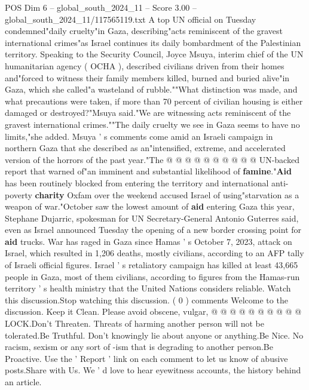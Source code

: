 \begin{textsample}{POS Dim 6 – global\_south\_2024\_11 – Score 3.00 – global\_south\_2024\_11/117565119.txt}  \label{ex:f6_pos_338}
A top UN official on Tuesday condemned"daily cruelty"in Gaza, describing"acts reminiscent of the gravest international crimes"as Israel continues its daily bombardment of the Palestinian territory.
Speaking to the Security Council, Joyce Msuya, interim chief of the UN humanitarian agency ( OCHA ), described civilians driven from their homes and"forced to witness their family members killed, burned and buried alive"in Gaza, which she called"a wasteland of rubble.""What distinction was made, and what precautions were taken, if more than 70 percent of civilian housing is either damaged or destroyed?"Msuya said."We are witnessing acts reminiscent of the gravest international crimes.""The daily cruelty we see in Gaza seems to have no limits,"she added.
Msuya ' s comments come amid an Israeli campaign in northern Gaza that she described as an"intensified, extreme, and accelerated version of the horrors of the past year."The @ @ @ @ @ @ @ @ @ @ UN-backed report that warned of"an imminent and substantial likelihood of \textbf{famine}."\textbf{Aid} has been routinely blocked from entering the territory and international anti-poverty \textbf{charity} Oxfam over the weekend accused Israel of using"starvation as a weapon of war."October saw the lowest amount of \textbf{aid} entering Gaza this year, Stephane Dujarric, spokesman for UN Secretary-General Antonio Guterres said, even as Israel announced Tuesday the opening of a new border crossing point for \textbf{aid} trucks.
War has raged in Gaza since Hamas ' s October 7, 2023, attack on Israel, which resulted in 1,206 deaths, mostly civilians, according to an AFP tally of Israeli official figures.
Israel ' s retaliatory campaign has killed at least 43,665 people in Gaza, most of them civilians, according to figures from the Hamas-run territory ' s health ministry that the United Nations considers reliable.
Watch this discussion.Stop watching this discussion. ( 0 ) comments Welcome to the discussion.
Keep it Clean.
Please avoid obscene, vulgar, @ @ @ @ @ @ @ @ @ @ LOCK.Don't Threaten.
Threats of harming another person will not be tolerated.Be Truthful.
Don't knowingly lie about anyone or anything.Be Nice.
No racism, sexism or any sort of -ism that is degrading to another person.Be Proactive.
Use the ' Report ' link on each comment to let us know of abusive posts.Share with Us.
We ' d love to hear eyewitness accounts, the history behind an article.

\end{textsample}
